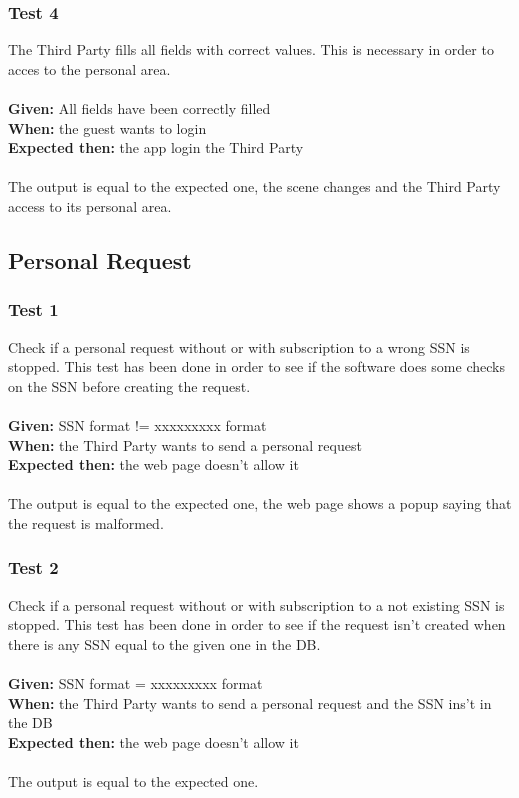 \subsubsection{\Large{Test 4}}
The Third Party fills all fields with correct values. This is necessary in order to acces to the personal area.\\
\\
\textbf{Given: } All fields have been correctly filled\\
\textbf{When: } the guest wants to login\\
\textbf{Expected then: } the app login the Third Party\\
\\
The output is equal to the expected one, the scene changes and the Third Party access to its personal area.

\subsection{Personal Request}

\subsubsection{\Large{Test 1}}
Check if a personal request without or with subscription to a wrong SSN is stopped. This test has been done in order to see if the software does some checks on the SSN before creating the request.\\
\\
\textbf{Given: } SSN format != xxxxxxxxx format\\
\textbf{When: } the Third Party wants to send a personal request\\
\textbf{Expected then: } the web page doesn't allow it\\
\\
The output is equal to the expected one, the web page shows a popup saying that the request is malformed.

\subsubsection{\Large{Test 2}}
Check if a personal request without or with subscription to a not existing SSN is stopped. This test has been done in order to see if the request isn't created when there is any SSN equal to the given one in the DB.\\
\\
\textbf{Given: } SSN format = xxxxxxxxx format \\
\textbf{When: } the Third Party wants to send a personal request and the SSN ins't in the DB\\
\textbf{Expected then: } the web page doesn't allow it\\
\\
The output is equal to the expected one.

